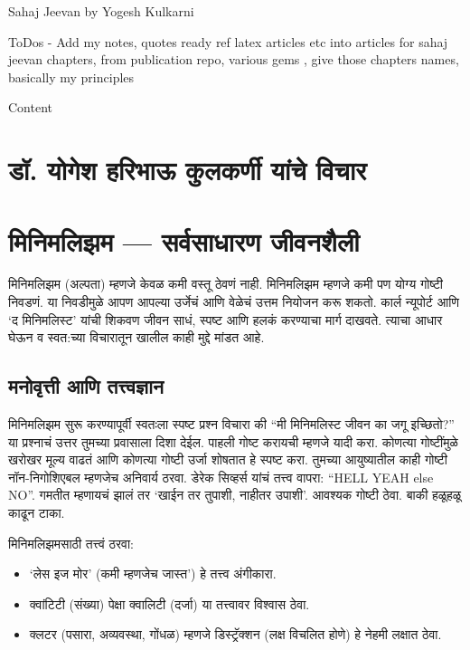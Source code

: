 Sahaj Jeevan by Yogesh Kulkarni 

ToDos
- Add my notes, quotes ready ref latex articles etc into articles for sahaj jeevan chapters, from publication repo, various gems , give those chapters names, basically my principles

Content

\chapter*{डॉ. योगेश हरिभाऊ कुलकर्णी  यांचे विचार }

\chapter{मिनिमलिझम — सर्वसाधारण जीवनशैली}

मिनिमलिझम (अल्पता)  म्हणजे केवळ कमी वस्तू ठेवणं नाही. मिनिमलिझम म्हणजे कमी पण योग्य गोष्टी निवडणं. या निवडीमुळे आपण आपल्या उर्जेचं आणि वेळेचं उत्तम नियोजन करू शकतो. कार्ल न्यूपोर्ट आणि ‘द मिनिमलिस्ट’  यांची शिकवण जीवन साधं, स्पष्ट आणि हलकं करण्याचा मार्ग दाखवते. त्याचा आधार घेऊन व स्वत:च्या विचारातून खालील काही मुद्दे मांडत आहे. 

\section*{मनोवृत्ती आणि तत्त्वज्ञान}

मिनिमलिझम सुरू करण्यापूर्वी स्वतःला स्पष्ट प्रश्न विचारा की “मी मिनिमलिस्ट जीवन का जगू इच्छितो?” या प्रश्नाचं उत्तर तुमच्या प्रवासाला दिशा देईल. पाहली गोष्ट करायची म्हणजे यादी करा. कोणत्या गोष्टींमुळे खरोखर मूल्य वाढतं आणि कोणत्या गोष्टी उर्जा शोषतात हे स्पष्ट करा. तुमच्या आयुष्यातील काही गोष्टी नॉन-निगोशिएबल म्हणजेच अनिवार्य ठरवा. डेरेक सिव्हर्स यांचं तत्त्व वापरा: “HELL YEAH else NO”. गमतीत म्हणायचं झालं  तर ‘खाईन तर तुपाशी, नाहीतर उपाशी’. आवश्यक गोष्टी ठेवा. बाकी हळूहळू काढून टाका.

मिनिमलिझमसाठी तत्त्वं ठरवा: 
\begin{itemize}
\item ‘लेस इज मोर’ (कमी म्हणजेच जास्त’) हे तत्त्व अंगीकारा.
\item क्वांटिटी (संख्या) पेक्षा  क्वालिटी (दर्जा) या तत्त्वावर विश्वास ठेवा.
\item क्लटर (पसारा, अव्यवस्था, गोंधळ) म्हणजे डिस्ट्रॅक्शन (लक्ष विचलित होणे) हे नेहमी लक्षात ठेवा.
\end{itemize}

